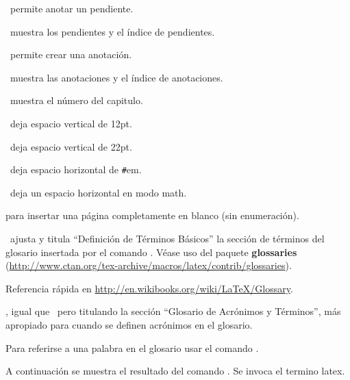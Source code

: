
\pa\ permite anotar un pendiente.

\ muestra los pendientes y el índice de pendientes.

\pa\ permite crear una anotación.

\ muestra las anotaciones y el índice de anotaciones.

\ muestra el número del capitulo.

\ deja espacio vertical de 12pt.

\ deja espacio vertical de 22pt.

\pa[\#]\ deja espacio horizontal de \texttt{\#}em.

\ deja un espacio horizontal en modo math.

 para insertar una página completamente en blanco (sin enumeración).


\ ajusta y titula ``Definición de Términos Básicos'' la sección de términos del glosario insertada por el comando . Véase uso del paquete \textbf{glossaries} (\url{http://www.ctan.org/tex-archive/macros/latex/contrib/glossaries}).

Referencia rápida en \url{http://en.wikibooks.org/wiki/LaTeX/Glossary}.

, igual que \ pero titulando la sección ``Glosario de Acrónimos y Términos'', más apropiado para cuando se definen acrónimos en el glosario.

Para referirse a una palabra en el glosario usar el comando . 

A continuación se muestra el resultado del comando . Se invoca el termino \gls{latex}.

\hacerglosario
